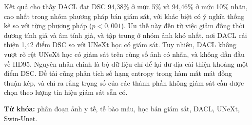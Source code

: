 \documentclass[12pt,a4paper,oneside]{report}
\begin{document}
Kết quả cho thấy DACL đạt DSC 94,38\% ở mức 5\% và 94,46\% ở mức 10\% nhãn, cao nhất trong nhóm phương pháp bán giám sát, với khác biệt có ý nghĩa thống kê so với từng phương pháp ($p<0{,}001$). Ưu thế này đến từ việc giảm đồng thời dương tính giả và âm tính giả, và tập trung ở nhóm ảnh khó nhất, nơi DACL cải thiện 1,42 điểm DSC so với UNeXt học có giám sát. Tuy nhiên, DACL không vượt rõ rệt UNeXt học có giám sát trên cùng số ảnh có nhãn, và không dẫn đầu về HD95. Nguyên nhân chính là bộ dữ liệu chỉ để lại dư địa cải thiện khoảng một điểm DSC. Đề tài cũng phân tích số hạng entropy trong hàm mất mát đồng thuận kép, và chỉ ra rằng trọng số của các thành phần không giám sát cần được chọn theo lượng tín hiệu giám sát sẵn có.

\noindent\textbf{Từ khóa:} phân đoạn ảnh y tế, tế bào máu, học bán giám sát, DACL, UNeXt, Swin-Unet.

\tableofcontents
\listoffigures
\listoftables
\end{document}

